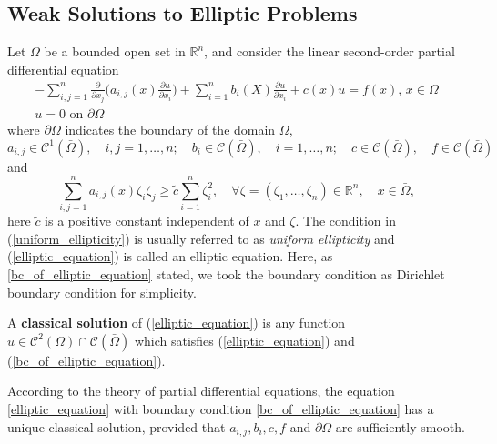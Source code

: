 \subsection{Weak Solutions to Elliptic Problems}
Let $\Omega$ be a bounded open set in $\mathbb{R}^n$, and consider the linear second-order partial differential equation
\begin{eqnarray}\label{elliptic_equation}
	-\sum_{i,j=1}^{n} \frac{\partial}{\partial x_j} \bigg(a_{i,j}(x)\frac{\partial u}{\partial x_i}\bigg) + \sum_{i=1}^{n} b_{i}(X)\frac{\partial u}{\partial x_i} + c(x)u = f(x) \text{,     } x \in \Omega \\
	\label{bc_of_elliptic_equation}
	u = 0 \text{ on } \partial\Omega
\end{eqnarray}
where $\partial\Omega$ indicates the boundary of the domain $\Omega$,
\begin{equation*}
a_{i,j} \in \mathscr{C}^1(\bar{\Omega}), \quad i,j = 1,\dots, n; \quad 
b_i \in \mathscr{C}(\bar{\Omega}), \quad i = 1,\dots, n;\quad
c \in \mathscr{C}(\bar{\Omega}), \quad f\in\mathscr{C}(\bar{\Omega})
\end{equation*}
and 
\begin{equation}\label{uniform_ellipticity}
	\sum_{i,j=1}^{n}a_{i,j}(x)\zeta_i \zeta_j \geq \tilde{c} \sum_{i=1}^{n} \zeta_i^2, \quad \forall\zeta = (\zeta_1,\dots, \zeta_n)\in \mathbb{R}^n, \quad  x\in \bar{\Omega},
\end{equation}
here $\tilde{c}$ is a positive constant independent of $x$ and $\zeta$. The condition in (\ref{uniform_ellipticity}) is usually referred to as \textit{uniform ellipticity} and (\ref{elliptic_equation}) is called an elliptic equation. Here, as \ref{bc_of_elliptic_equation} stated, we took the boundary condition as Dirichlet boundary condition for simplicity.\\
\begin{defn}
	A \textbf{classical solution} of (\ref{elliptic_equation}) is any function $u\in\mathscr{C}^2(\Omega)\cap\mathscr{C}(\bar{\Omega})$ which satisfies (\ref{elliptic_equation}) and (\ref{bc_of_elliptic_equation}). 
\end{defn}
According to the theory of partial differential equations, the equation \eqref{elliptic_equation} with boundary condition \eqref{bc_of_elliptic_equation} has a unique classical solution, provided that $a_{i,j} , b_i , c, f$ and $\partial\Omega$ are sufficiently smooth. %

